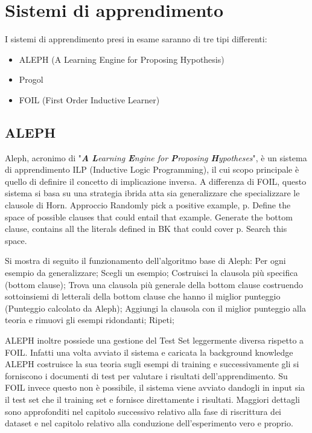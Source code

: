 \section{Sistemi di apprendimento}

I sistemi di apprendimento presi in esame saranno di tre tipi differenti:

\begin{itemize}
	\item ALEPH (A Learning Engine for Proposing Hypothesis)
	\item Progol 
	\item FOIL (First Order Inductive Learner)
\end{itemize}

\subsection{ALEPH}
Aleph, acronimo di "\emph{\textbf{A} \textbf{L}earning \textbf{E}ngine for \textbf{P}roposing \textbf{H}ypotheses}", è un sistema di apprendimento ILP (Inductive Logic Programming), il cui scopo principale è quello di  definire il concetto di implicazione inversa.
A differenza di FOIL, questo sistema si basa su una strategia ibrida atta sia generalizzare che specializzare le clausole di Horn. 
Approccio
Randomly pick a positive example, p.
Define the space of possible clauses that could entail that example.
Generate the bottom clause, 
contains all the literals defined in BK that could cover p.
Search this space.

Si mostra di seguito il funzionamento dell’algoritmo base di Aleph:
Per ogni esempio da generalizzare;
Scegli un esempio;
Costruisci la clausola più specifica (bottom clause);
Trova una clausola più generale della bottom clause costruendo
sottoinsiemi di letterali della bottom clause che hanno il
miglior punteggio (Punteggio calcolato da Aleph);
Aggiungi la clausola con il miglior punteggio alla teoria e
rimuovi gli esempi ridondanti;
Ripeti;

ALEPH inoltre possiede una gestione del Test Set leggermente diversa rispetto a FOIL. Infatti una volta avviato il sistema e caricata la background knowledge ALEPH costruisce la sua teoria sugli esempi di training e successivamente gli si forniscono i documenti di test per valutare i risultati dell’apprendimento. Su FOIL invece questo non è possibile, il sistema viene avviato dandogli in input sia il test set che il training set e fornisce direttamente i risultati. Maggiori dettagli sono approfonditi nel capitolo successivo relativo alla fase di riscrittura dei dataset e nel capitolo relativo alla conduzione dell’esperimento vero e proprio.


